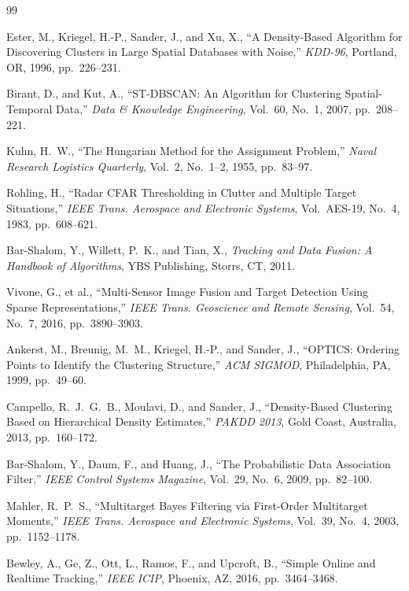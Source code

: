\documentclass[conf]{new-aiaa}
\begin{document}
\begin{thebibliography}{99}

Ester, M., Kriegel, H.-P., Sander, J., and Xu, X., ``A Density-Based Algorithm for Discovering Clusters in Large Spatial Databases with Noise,'' \textit{KDD-96}, Portland, OR, 1996, pp.~226--231.

Birant, D., and Kut, A., ``ST-DBSCAN: An Algorithm for Clustering Spatial-Temporal Data,'' \textit{Data \& Knowledge Engineering}, Vol.~60, No.~1, 2007, pp.~208--221.

Kuhn, H.~W., ``The Hungarian Method for the Assignment Problem,'' \textit{Naval Research Logistics Quarterly}, Vol.~2, No.~1--2, 1955, pp.~83--97.

Rohling, H., ``Radar CFAR Thresholding in Clutter and Multiple Target Situations,'' \textit{IEEE Trans. Aerospace and Electronic Systems}, Vol.~AES-19, No.~4, 1983, pp.~608--621.

Bar-Shalom, Y., Willett, P.~K., and Tian, X., \textit{Tracking and Data Fusion: A Handbook of Algorithms}, YBS Publishing, Storrs, CT, 2011.

Vivone, G., et al., ``Multi-Sensor Image Fusion and Target Detection Using Sparse Representations,'' \textit{IEEE Trans. Geoscience and Remote Sensing}, Vol.~54, No.~7, 2016, pp.~3890--3903.

Ankerst, M., Breunig, M.~M., Kriegel, H.-P., and Sander, J., ``OPTICS: Ordering Points to Identify the Clustering Structure,'' \textit{ACM SIGMOD}, Philadelphia, PA, 1999, pp.~49--60.

Campello, R.~J.~G.~B., Moulavi, D., and Sander, J., ``Density-Based Clustering Based on Hierarchical Density Estimates,'' \textit{PAKDD 2013}, Gold Coast, Australia, 2013, pp.~160--172.

Bar-Shalom, Y., Daum, F., and Huang, J., ``The Probabilistic Data Association Filter,'' \textit{IEEE Control Systems Magazine}, Vol.~29, No.~6, 2009, pp.~82--100.

Mahler, R.~P.~S., ``Multitarget Bayes Filtering via First-Order Multitarget Moments,'' \textit{IEEE Trans. Aerospace and Electronic Systems}, Vol.~39, No.~4, 2003, pp.~1152--1178.

Bewley, A., Ge, Z., Ott, L., Ramos, F., and Upcroft, B., ``Simple Online and Realtime Tracking,'' \textit{IEEE ICIP}, Phoenix, AZ, 2016, pp.~3464--3468.

\end{thebibliography}
\end{document}
